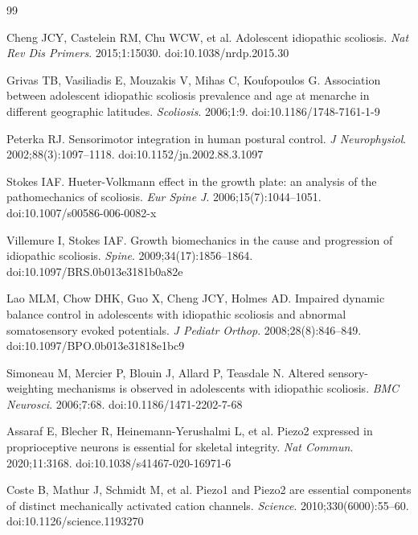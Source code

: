 \documentclass[12pt,a4paper]{article}
\begin{document}
\begin{thebibliography}{99}

Cheng JCY, Castelein RM, Chu WCW, et al.
Adolescent idiopathic scoliosis.
\textit{Nat Rev Dis Primers}. 2015;1:15030.
doi:10.1038/nrdp.2015.30

Grivas TB, Vasiliadis E, Mouzakis V, Mihas C, Koufopoulos G.
Association between adolescent idiopathic scoliosis prevalence and age at menarche in different geographic latitudes.
\textit{Scoliosis}. 2006;1:9.
doi:10.1186/1748-7161-1-9

Peterka RJ.
Sensorimotor integration in human postural control.
\textit{J Neurophysiol}. 2002;88(3):1097--1118.
doi:10.1152/jn.2002.88.3.1097

Stokes IAF.
Hueter-Volkmann effect in the growth plate: an analysis of the pathomechanics of scoliosis.
\textit{Eur Spine J}. 2006;15(7):1044--1051.
doi:10.1007/s00586-006-0082-x

Villemure I, Stokes IAF.
Growth biomechanics in the cause and progression of idiopathic scoliosis.
\textit{Spine}. 2009;34(17):1856--1864.
doi:10.1097/BRS.0b013e3181b0a82e

Lao MLM, Chow DHK, Guo X, Cheng JCY, Holmes AD.
Impaired dynamic balance control in adolescents with idiopathic scoliosis and abnormal somatosensory evoked potentials.
\textit{J Pediatr Orthop}. 2008;28(8):846--849.
doi:10.1097/BPO.0b013e31818e1bc9

Simoneau M, Mercier P, Blouin J, Allard P, Teasdale N.
Altered sensory-weighting mechanisms is observed in adolescents with idiopathic scoliosis.
\textit{BMC Neurosci}. 2006;7:68.
doi:10.1186/1471-2202-7-68

Assaraf E, Blecher R, Heinemann-Yerushalmi L, et al.
Piezo2 expressed in proprioceptive neurons is essential for skeletal integrity.
\textit{Nat Commun}. 2020;11:3168.
doi:10.1038/s41467-020-16971-6

Coste B, Mathur J, Schmidt M, et al.
Piezo1 and Piezo2 are essential components of distinct mechanically activated cation channels.
\textit{Science}. 2010;330(6000):55--60.
doi:10.1126/science.1193270


\end{thebibliography}
\end{document}
